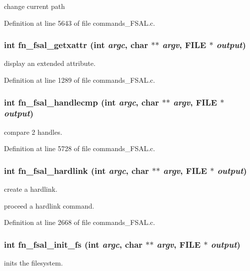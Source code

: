 change current path 

Definition at line 5643 of file commands\_\-FSAL.c.
\subsubsection[{fn\_\-fsal\_\-getxattr}]{\setlength{\rightskip}{0pt plus 5cm}int fn\_\-fsal\_\-getxattr (int {\em argc}, \/  char $\ast$$\ast$ {\em argv}, \/  FILE $\ast$ {\em output})}\label{commands_8h_a1bc9d8bedd2c8b5adb767b449879ee18}
display an extended attribute. 

Definition at line 1289 of file commands\_\-FSAL.c.
\subsubsection[{fn\_\-fsal\_\-handlecmp}]{\setlength{\rightskip}{0pt plus 5cm}int fn\_\-fsal\_\-handlecmp (int {\em argc}, \/  char $\ast$$\ast$ {\em argv}, \/  FILE $\ast$ {\em output})}\label{commands_8h_ac09a903f6e71134eb73920e6bc873b63}
compare 2 handles. 

Definition at line 5728 of file commands\_\-FSAL.c.
\subsubsection[{fn\_\-fsal\_\-hardlink}]{\setlength{\rightskip}{0pt plus 5cm}int fn\_\-fsal\_\-hardlink (int {\em argc}, \/  char $\ast$$\ast$ {\em argv}, \/  FILE $\ast$ {\em output})}\label{commands_8h_ac9df7662f276abcf5428e6ff5f44593c}
create a hardlink.

proceed a hardlink command. 

Definition at line 2668 of file commands\_\-FSAL.c.
\subsubsection[{fn\_\-fsal\_\-init\_\-fs}]{\setlength{\rightskip}{0pt plus 5cm}int fn\_\-fsal\_\-init\_\-fs (int {\em argc}, \/  char $\ast$$\ast$ {\em argv}, \/  FILE $\ast$ {\em output})}\label{commands_8h_a1c17fec3f6f369ed33c6e6881c7600e1}
inits the filesystem.

